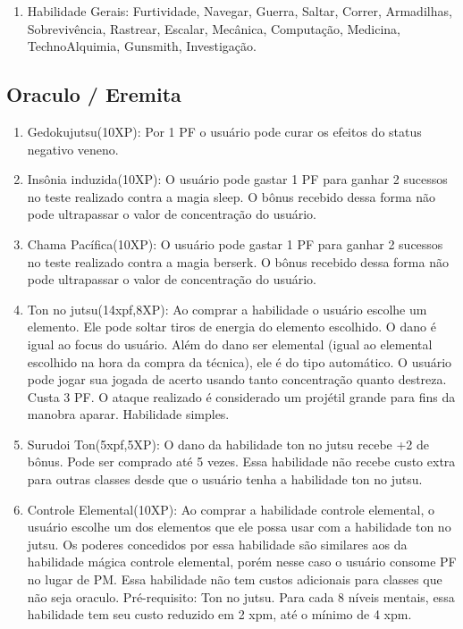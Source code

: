 \begin{enumerate}
		
 	\item Habilidade Gerais: Furtividade, Navegar, Guerra, Saltar, Correr, Armadilhas, Sobrevivência, Rastrear, Escalar, Mecânica, Computação, Medicina, TechnoAlquimia, Gunsmith,  Investigação.

 	
\end{enumerate}
 
 \subsection{Oraculo / Eremita} 
 	
\begin{enumerate}

	\item Gedokujutsu(10XP): Por 1 PF o usuário pode curar os efeitos do status negativo veneno.

	\item Insônia induzida(10XP): O usuário pode gastar 1 PF para ganhar 2 sucessos no teste realizado contra a magia sleep. O bônus recebido dessa forma não pode ultrapassar o valor de concentração do usuário.

	\item Chama Pacífica(10XP): O usuário pode gastar 1 PF para ganhar 2 sucessos no teste realizado contra a magia berserk. O bônus recebido dessa forma não pode ultrapassar o valor de concentração do usuário.

	\item Ton no jutsu(14xpf,8XP): Ao comprar a habilidade o usuário escolhe um elemento. Ele pode soltar tiros de energia do elemento escolhido. O dano é igual ao focus do usuário. Além do dano ser elemental (igual ao elemental escolhido na hora da compra da técnica), ele é do tipo automático. O usuário pode jogar sua jogada de acerto usando tanto concentração quanto destreza. Custa 3 PF. O ataque realizado é considerado um projétil grande para fins da manobra aparar. Habilidade simples. 

	\item Surudoi Ton(5xpf,5XP):  O dano da habilidade ton no jutsu recebe +2 de bônus. Pode ser comprado até 5 vezes. Essa habilidade não recebe custo extra para outras classes desde que o usuário tenha a habilidade ton no jutsu.

 	\item Controle Elemental(10XP): Ao comprar a habilidade controle elemental, o usuário escolhe um dos elementos que ele possa usar com a habilidade ton no jutsu. Os poderes concedidos por essa habilidade são similares aos da habilidade mágica controle elemental, porém nesse caso o usuário consome PF no lugar de PM. Essa habilidade não tem custos adicionais para classes que não seja oraculo. Pré-requisito: Ton no jutsu. Para cada 8 níveis mentais, essa habilidade tem seu custo reduzido em 2 xpm, até o mínimo de 4 xpm.


\end{enumerate}
